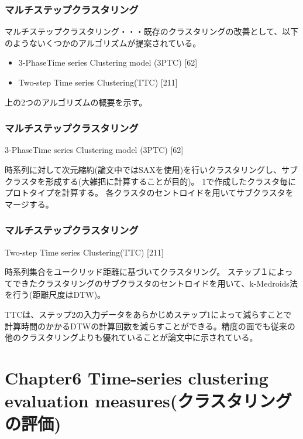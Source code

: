 \documentclass[dvipdfmx,11pt,notheorems]{beamer}
\theoremstyle{definition}
\begin{document}
\begin{frame}\frametitle{マルチステップクラスタリング}
マルチステップクラスタリング・・・既存のクラスタリングの改善として、以下のようないくつかのアルゴリズムが提案されている。
\begin{itemize}
\item 3-PhaseTime series Clustering model (3PTC) [62]
\item Two-step Time series Clustering(TTC) [211]
\end{itemize}
上の2つのアルゴリズムの概要を示す。
\end{frame}

\begin{frame}\frametitle{マルチステップクラスタリング}
\begin{algorithm}[H]
\caption{3-PhaseTime series Clustering model (3PTC) [62]}
\begin{algorithmic}[1]
\STATE 時系列に対して次元縮約(論文中ではSAXを使用)を行いクラスタリングし、サブクラスタを形成する(大雑把に計算することが目的)。
\STATE 1で作成したクラスタ毎にプロトタイプを計算する。
\STATE 各クラスタのセントロイドを用いてサブクラスタをマージする。
\end{algorithmic}
\end{algorithm}
\end{frame}

\begin{frame}\frametitle{マルチステップクラスタリング}
\begin{algorithm}[H]
\caption{Two-step Time series Clustering(TTC) [211]}
\begin{algorithmic}[1]
\STATE 時系列集合をユークリッド距離に基づいてクラスタリング。
\STATE ステップ１によってできたクラスタリングのサブクラスタのセントロイドを用いて、k-Medroids法を行う(距離尺度はDTW)。
\end{algorithmic}
\end{algorithm}
TTCは、ステップ2の入力データをあらかじめステップ1によって減らすことで計算時間のかかるDTWの計算回数を減らすことができる。精度の面でも従来の他のクラスタリングよりも優れていることが論文中に示されている。
\end{frame}



\section{Chapter6 Time-series clustering evaluation measures(クラスタリングの評価)}
\end{document}
